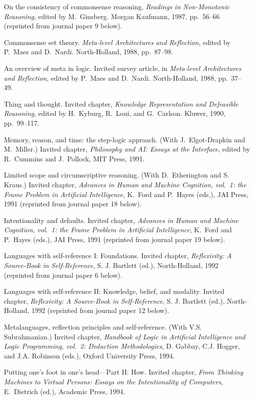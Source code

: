 \paper
On the consistency of commonsense reasoning. 
{\sl Readings in Non-Monotonic Reasoning}, edited
by M.~Ginsberg. Morgan Kaufmann, 1987, pp.~56--66
(reprinted from journal paper 9 below).

\paper{}
Commonsense set theory.
{\sl Meta-level Architectures and Reflection}, edited
by P.~Maes and D.~Nardi. North-Holland, 1988, pp.~87--98.

\paper{}
An overview of meta in logic.
Invited survey article, in
{\sl Meta-level Architectures and Reflection}, edited
by P.~Maes and D.~Nardi. North-Holland, 1988, pp.~37--49.

\paper
Thing and thought.
Invited chapter, 
{\sl Knowledge Representation and Defeasible Reasoning},
edited by H.~Kyburg, R.~Loui, and G.~Carlson.
Kluwer, 1990, pp.~99--117.

\paper
Memory, reason, and time: the step-logic approach.
(With J.~Elgot-Drapkin and M.~Miller.)
Invited chapter, {\sl Philosophy and AI: Essays at the Interface},
edited by R.~Cummins and J.~Pollock, MIT Press, 1991.

\paper
Limited scope and circumscriptive reasoning.
(With D.~Etherington and S.~ Kraus.)
Invited chapter,
{\sl Advances in Human and Machine Cognition,
vol.~1: the Frame Problem in Artificial Intelligence},
K.~Ford and P.~Hayes (eds.), JAI Press, 1991
(reprinted from journal paper 18 below).

\paper
Intentionality and defaults.
Invited chapter,
{\sl Advances in Human and Machine Cognition,
vol.~1: the Frame Problem in Artificial Intelligence},
K.~Ford and P.~Hayes (eds.), JAI Press, 1991
(reprinted from journal paper 19 below).

\paper
Languages with self-reference I: Foundations. Invited
chapter,
{\sl Reflexivity: A Source-Book in Self-Reference},
S. J. Bartlett (ed.), North-Holland, 1992
(reprinted from journal paper 6 below).

\paper
Languages with self-reference II: Knowledge, belief,
and modality. Invited chapter,
{\sl Reflexivity: A Source-Book in Self-Reference},
S. J. Bartlett (ed.), North-Holland, 1992
(reprinted from journal paper 12 below).

\paper
Metalanguages, reflection principles and self-reference.
(With V.S. Subrahmanian.)
Invited chapter,
{\sl Handbook of Logic in Artificial Intelligence and Logic
Programming, vol.~2: Deduction Methodologies}, D. Gabbay, C.J. Hogger,
and J.A. Robinson (eds.), Oxford University Press, 1994.

\paper
Putting one's foot in one's head---Part II: How.
Invited chapter, 
{\sl From Thinking Machines to Virtual Persons:
Essays on the Intentionality of Computers},
E.~Dietrich (ed.), Academic Press, 1994.

